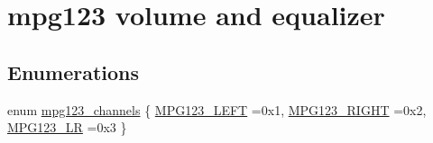 \hypertarget{group__mpg123__voleq}{}\section{mpg123 volume and equalizer}
\label{group__mpg123__voleq}
\subsection*{Enumerations}
\begin{DoxyCompactItemize}
\item 
enum \mbox{\hyperlink{group__mpg123__voleq_gaf6ae0d8c593d295c36e7d20e9f892840}{mpg123\+\_\+channels}} \{ \mbox{\hyperlink{group__mpg123__voleq_ggaf6ae0d8c593d295c36e7d20e9f892840a0442a02c69eba4474b27d271da00478a}{M\+P\+G123\+\_\+\+L\+E\+FT}} =0x1, 
\mbox{\hyperlink{group__mpg123__voleq_ggaf6ae0d8c593d295c36e7d20e9f892840a15ced0bea77e48f6e23d15410058d543}{M\+P\+G123\+\_\+\+R\+I\+G\+HT}} =0x2, 
\mbox{\hyperlink{group__mpg123__voleq_ggaf6ae0d8c593d295c36e7d20e9f892840ab3dd5fa5351f27c4678e30013fceee2b}{M\+P\+G123\+\_\+\+LR}} =0x3
 \}
\end{DoxyCompactItemize}
